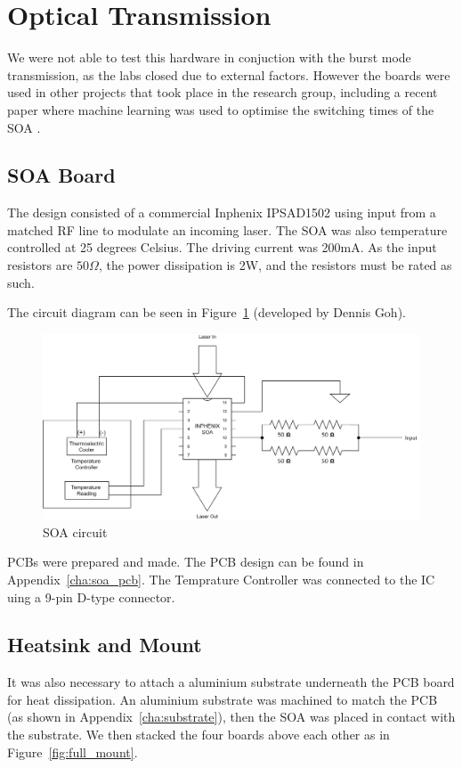 \cleardoublepage
\section{Optical Transmission}%
\label{optical_transmission}
We were not able to test this hardware in conjuction with the burst mode
transmission, as the labs closed due to external factors. However the boards
were used in other projects that took place in the research group, including a
recent paper where machine learning was used to optimise the switching times of
the SOA \cite{gerard2020swift}.

\subsection{SOA Board}%
\label{sub:soa_board}
The design consisted of a commercial Inphenix IPSAD1502 using input from a 
matched RF line to modulate an incoming laser. The SOA was also temperature
controlled at 25 degrees Celsius. 
The driving current was 200mA. As the input resistors are $50\Omega$, the power
dissipation is 2W, and the resistors must be rated as such.

\noindent
The circuit diagram can be seen in Figure~\ref{fig:soa_circuit} (developed by
Dennis Goh).

\begin{figure}[ht]
    \centering
    \hspace*{-1cm}\includegraphics[width=1.3\linewidth]{img/soa_circuit.png}
    \caption{SOA circuit}%
    \label{fig:soa_circuit}
\end{figure}

 PCBs were prepared and made. The PCB design can be found in Appendix~\ref{cha:soa_pcb}.
The Temprature Controller was connected to the IC uing a 9-pin D-type
connector.

\cleardoublepage 
\subsection{Heatsink and Mount}%
\label{sub:heatsink_and_mount}
It was also necessary to attach a aluminium substrate underneath the PCB board
for heat dissipation. An aluminium substrate was machined to match the PCB (as shown in
Appendix~\ref{cha:substrate}), then the SOA was placed in contact with the
substrate.  We then stacked the four boards above each other as in
Figure~\ref{fig:full_mount}.

